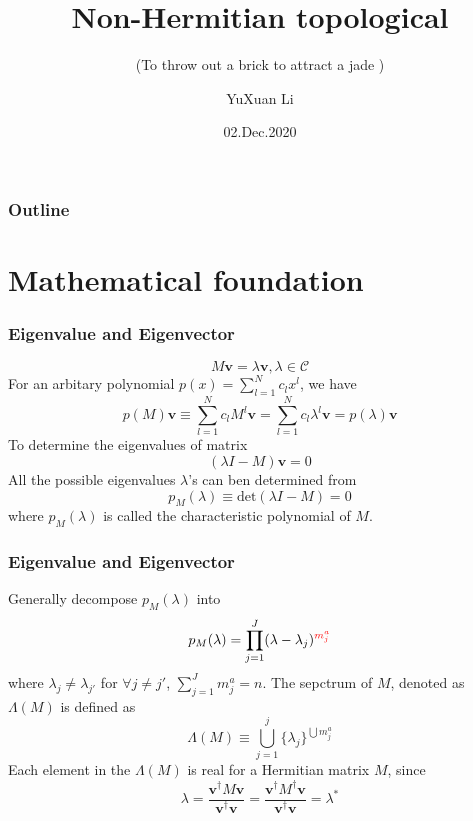\documentclass{beamer}
\title[CMT.SCNU]{Non-Hermitian topological}
\subtitle{(To throw out a brick to attract a jade
	)}
\author[YuXuan Li]
{YuXuan Li\inst{1}}
\institute[Physics@SCNU] 
{
  \inst{1}%
  Department of Physics\\
 South China Normal University 
}
\date[SCNU]{02.Dec.2020}
\begin{document}
  \frame{\titlepage}

  \begin{frame}
    \frametitle{Outline}
    \tableofcontents
  \end{frame}
\section{Mathematical foundation}

\begin{frame}
\frametitle{Eigenvalue and Eigenvector}
\begin{equation}
M\mathbf{v}=\lambda\mathbf{v},\lambda\in\mathcal{C}
\end{equation}
For an arbitary polynomial $p(x)=\sum_{l=1}^Nc_lx^l$, we have
\begin{equation}
p(M)\mathbf{v}\equiv\sum_{l=1}^Nc_lM^l\mathbf{v}=\sum_{l=1}^Nc_l\lambda^l\mathbf{v}=p(\lambda)\mathbf{v}
\end{equation}
To determine the eigenvalues of matrix
\begin{equation}
(\lambda I-M)\mathbf{v}=0
\end{equation}
All the possible eigenvalues $\lambda$'s can ben determined from
\begin{equation}
p_M(\lambda)\equiv \textrm{det}(\lambda I-M)=0
\end{equation}
where $p_M(\lambda)$ is called the characteristic polynomial of $M$.
\end{frame}
\begin{frame}
\frametitle{Eigenvalue and Eigenvector}
Generally decompose $p_M(\lambda)$ into 
\begin{equation}
p_M(\lambda)=\prod_{j=1}^{J}(\lambda-\lambda_j)^{\textcolor{red}{m_j^a}}
\end{equation}
where $\lambda_j\neq\lambda_{j'}$ for $\forall j\neq j'$, $\sum_{j=1}^{J}m_j^a=n$. The sepctrum of $M$, denoted as $\Lambda(M)$ is defined as
\begin{equation}
\Lambda(M)\equiv\bigcup_{j=1}^{j}\{\lambda_j \}^{\bigcup m_j^a}
\end{equation}
Each element in the $\Lambda(M)$ is real for a Hermitian matrix $M$, since
\begin{equation}
\lambda=\frac{\mathbf{v}^\dagger M\mathbf{v}}{\mathbf{v}^\dagger\mathbf{v}}=\frac{\mathbf{v}^\dagger M^\dagger\mathbf{v}}{\mathbf{v}^\dagger\mathbf{v}}=\lambda^*
\end{equation}
\end{frame}
\end{document}
